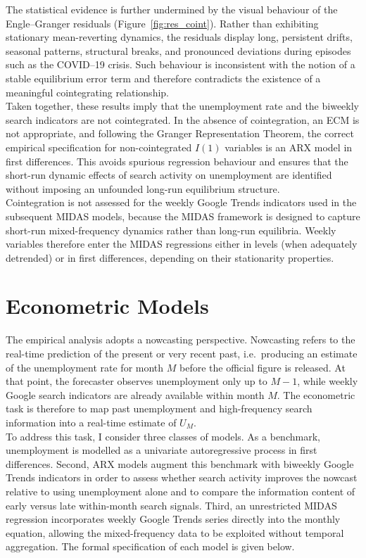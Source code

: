 \documentclass[12pt,a4paper]{article}
\begin{document}
The statistical evidence is further undermined by the visual behaviour of the 
Engle--Granger residuals (Figure~\ref{fig:res_coint}). Rather than exhibiting 
stationary mean-reverting dynamics, the residuals display long, persistent drifts, 
seasonal patterns, structural breaks, and pronounced deviations during episodes such 
as the COVID--19 crisis. Such behaviour is inconsistent with the notion of a stable 
equilibrium error term and therefore contradicts the existence of a meaningful 
cointegrating relationship.
\\
Taken together, these results imply that the unemployment rate and the biweekly search 
indicators are not cointegrated. In the absence of cointegration, an ECM is not 
appropriate, and following the Granger Representation Theorem, the correct empirical 
specification for non-cointegrated $I(1)$ variables is an ARX model in first 
differences. This avoids spurious regression behaviour and ensures that the short-run 
dynamic effects of search activity on unemployment are identified without imposing an 
unfounded long-run equilibrium structure.\\
Cointegration is not assessed for the weekly Google Trends indicators used in the 
subsequent MIDAS models, because the MIDAS framework is designed to capture short-run 
mixed-frequency dynamics rather than long-run equilibria. Weekly variables therefore 
enter the MIDAS regressions either in levels (when adequately detrended) or in first 
differences, depending on their stationarity properties.



\section{Econometric Models}
The empirical analysis adopts a nowcasting perspective. Nowcasting refers to the
real-time prediction of the present or very recent past, i.e.\ producing an
estimate of the unemployment rate for month $M$ before the official figure is
released. At that point, the forecaster observes unemployment only up to
$M-1$, while weekly Google search indicators are already available within
month $M$. The econometric task is therefore to map past unemployment and
high-frequency search information into a real-time estimate of $U_M$.\\
To address this task, I consider three classes of models. As a benchmark,
unemployment is modelled as a univariate autoregressive process in first
differences. Second, ARX models augment this benchmark with biweekly Google
Trends indicators in order to assess whether search activity improves the
nowcast relative to using unemployment alone and to compare the information
content of early versus late within-month search signals. Third, an
unrestricted MIDAS regression incorporates weekly Google Trends series
directly into the monthly equation, allowing the mixed-frequency data to be
exploited without temporal aggregation. The formal specification of each
model is given below.
\end{document}
